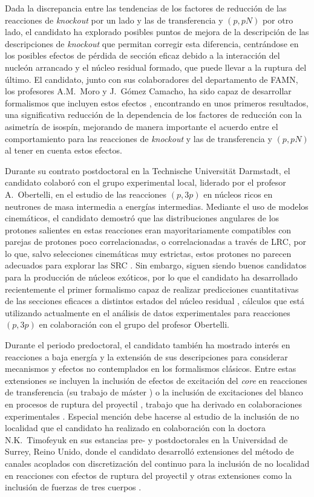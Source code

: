 \documentclass[a4paper,12pt,twoside]{article}
\begin{document}
Dada la discrepancia entre las tendencias de los factores de reducción de las reacciones de \textit{knockout} por un lado y las de transferencia y $(p,pN)$ por otro lado, el candidato ha explorado posibles puntos de mejora de la descripción de las descripciones de \textit{knockout} que permitan corregir esta diferencia, centrándose en los posibles efectos de pérdida de sección eficaz debido a la interacción del nucleón arrancado y el núcleo residual formado, que puede llevar a la ruptura del último.  El candidato, junto con sus colaboradores del departamento de FAMN, los profesores A.M.~Moro y J.~Gómez Camacho, ha sido capaz de desarrollar formalismos que incluyen estos efectos \cite{complexcdcc,quenching}, encontrando en unos primeros resultados, una significativa reducción de la dependencia de los factores de reducción con la asimetría de isospín, mejorando de manera importante el acuerdo entre el comportamiento para las reacciones de \textit{knockout} y las de transferencia y $(p,pN)$ al tener en cuenta estos efectos.

Durante su contrato postdoctoral en la Technische Universität Darmstadt, el candidato colaboró con el grupo experimental local, liderado por el profesor A.~Obertelli, en el estudio de las reacciones $(p,3p)$ en núcleos ricos en neutrones de masa intermedia a energías intermedias. Mediante el uso de modelos cinemáticos, el candidato demostró que las distribuciones angulares de los protones salientes en estas reacciones eran mayoritariamente compatibles con parejas de protones poco correlacionadas, o correlacionadas a través de LRC, por lo que, salvo selecciones cinemáticas muy estrictas, estos protones no parecen adecuados para explorar las SRC \cite{axel}. Sin embargo, siguen siendo buenos candidatos para la producción de núcleos exóticos, por lo que el candidato ha desarrollado recientemente el primer formalismo capaz de realizar predicciones cuantitativas de las secciones eficaces a distintos estados del núcleo residual \cite{p3p}, cálculos que está utilizando actualmente en el análisis de datos experimentales para reacciones $(p,3p)$ en colaboración con el grupo del profesor Obertelli.

Durante el periodo predoctoral, el candidato también ha mostrado interés en reacciones a baja energía y la extensión de sus descripciones para considerar mecanismos y efectos no contemplados en los formalismos clásicos. Entre estas extensiones se incluyen la inclusión de efectos de excitación del \textit{core} en reacciones de transferencia (su trabajo de máster \cite{transferx}) o la inclusión de excitaciones del blanco en procesos de ruptura del proyectil \cite{texc,texctransfer}, trabajo que ha derivado en colaboraciones experimentales \cite{vinicius}. Especial mención debe hacerse al estudio de la inclusión de no localidad que el candidato ha realizado en colaboración con la doctora N.K.~Timofeyuk en sus estancias pre- y postdoctorales en la Universidad de Surrey, Reino Unido, donde el candidato desarrolló extensiones del método de canales acoplados con discretización del continuo para la inclusión de no localidad en reacciones con efectos de ruptura del proyectil \cite{Tim18,Tim19,Fro23} y otras extensiones como la inclusión de fuerzas de tres cuerpos \cite{3nf}. 
\end{document}
